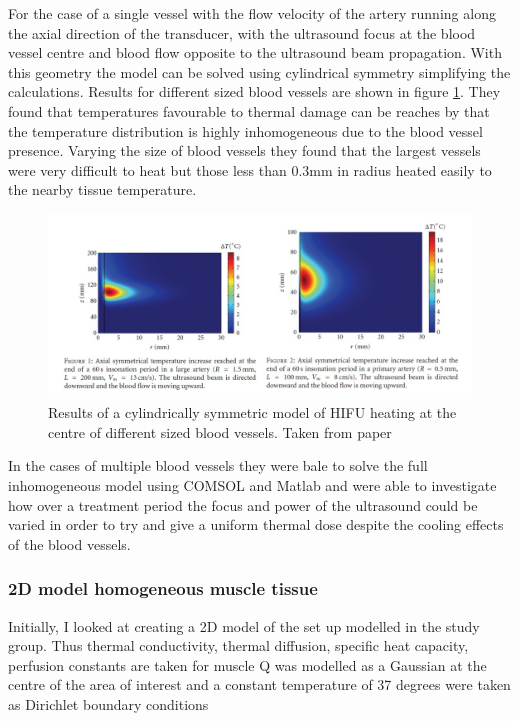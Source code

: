 \documentclass[11pt]{article} %
\begin{document}
\begin{itemize}
	For the case of a single vessel  with the flow velocity of the artery running along the axial direction of the transducer, with the ultrasound focus at the blood vessel centre and blood flow opposite to the ultrasound beam propagation. With this geometry the model can be solved using cylindrical symmetry simplifying the calculations.  Results for different sized blood vessels are shown in figure \ref{fig:sassaroli}. They found that temperatures favourable to thermal damage can be reaches by that the temperature distribution is highly inhomogeneous due to the blood vessel presence.  Varying the size of blood vessels they found that the largest vessels were very difficult to heat but those less than 0.3mm in radius heated easily to the nearby tissue temperature.
	\begin{figure}
		\centering
		\includegraphics[width=\linewidth]{Report_images/sassaroli}
		\caption{Results of a cylindrically symmetric model of HIFU heating at the centre of different sized blood vessels. Taken from paper \cite{Sassaroli2012}}
		\label{fig:sassaroli}
	\end{figure}
	
	In the cases of multiple blood vessels they were bale to solve the full inhomogeneous model using COMSOL and Matlab and were able to investigate how over a treatment period the focus and power of the ultrasound could be varied in order to try and give a uniform thermal dose despite the cooling effects of the blood vessels.   
\end{itemize}





 
 \subsubsection{2D model homogeneous muscle tissue}
Initially, I looked at creating a 2D model of the set up modelled in the study group. Thus thermal conductivity, thermal diffusion, specific heat capacity, perfusion constants are taken for muscle 
Q was modelled as a Gaussian at the centre of the area of interest and a constant temperature of 37 degrees  were taken as Dirichlet boundary conditions 
\end{document}
